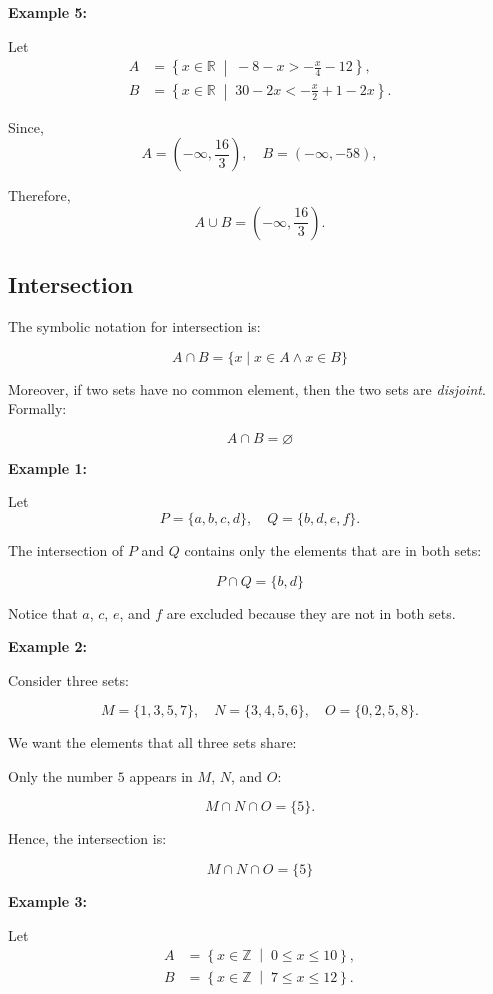 \documentclass[12pt,a4paper,openany]{article}
\begin{document}
\textbf{Example 5:}

Let  
\[
\begin{aligned}
A &= \left\{ x \in \mathbb{R} \;\middle|\; -8 - x > -\frac{x}{4} - 12 \right\}, \\
B &= \left\{ x \in \mathbb{R} \;\middle|\; 30 - 2x < -\frac{x}{2} + 1 - 2x \right\}.
\end{aligned}
\]

Since,  
\[
A = \left(-\infty,\frac{16}{3}\right), \quad
B = (-\infty,-58),
\]

Therefore,  
\[
\boxed{A \cup B = \left(-\infty,\frac{16}{3}\right)}.
\]

\subsection{Intersection}\label{Intersection}

The symbolic notation for intersection is:

$$A \cap B = \{x \mid x \in A \land x \in B\}$$

Moreover, if two sets have no common element, then the two sets are \textit{disjoint}. 
Formally:  

$$A \cap B = \varnothing$$

\textbf{Example 1:}

Let  
\[
P = \{a, b, c, d\}, \quad Q = \{b, d, e, f\}.
\]

The intersection of $P$ and $Q$ contains only the elements that are in both sets:

\[
\boxed{P \cap Q = \{b, d\}}
\]

Notice that $a$, $c$, $e$, and $f$ are excluded because they are not in both sets.

\textbf{Example 2:}

Consider three sets:

\[
M = \{1, 3, 5, 7\}, \quad
N = \{3, 4, 5, 6\}, \quad
O = \{0, 2, 5, 8\}.
\]

We want the elements that all three sets share:

Only the number $5$ appears in $M$, $N$, and $O$:

\[
M \cap N \cap O = \{5\}.
\]

Hence, the intersection is:

\[
\boxed{M \cap N \cap O = \{5\}}
\]

\textbf{Example 3:}

Let  
\[
\begin{aligned}
A &= \left\{ x \in \mathbb{Z} \;\middle|\; 0 \le x \le 10 \right\}, \\
B &= \left\{ x \in \mathbb{Z} \;\middle|\; 7 \le x \le 12 \right\}.
\end{aligned}
\]
\end{document}
